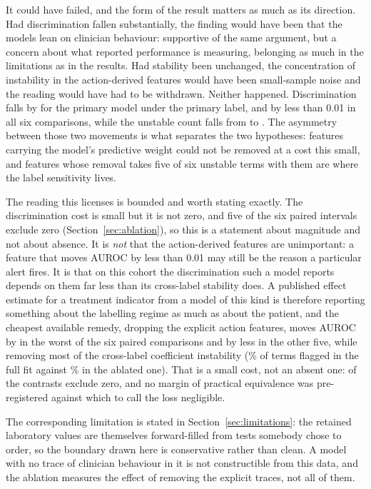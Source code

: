 It could have failed, and the form of the result matters as much as its
direction. Had discrimination fallen substantially, the finding would have been
that the models lean on clinician behaviour: supportive of the same argument,
but a concern about what reported performance is measuring, belonging as much in
the limitations as in the results. Had stability been unchanged, the
concentration of instability in the action-derived features would have been
small-sample noise and the reading would have had to be withdrawn. Neither
happened. Discrimination falls by \pcAblDeltaAurocPrimaryB{} for the primary
model under the primary label, and by less than 0.01 in all six comparisons,
while the unstable count falls from \pcHTwoEst{} to \pcAblHTwoNUnstable. The
asymmetry between those two movements is what separates the two hypotheses:
features carrying the model's predictive weight could not be removed at a cost
this small, and features whose removal takes five of six unstable terms with
them are where the label sensitivity lives.

The reading this licenses is bounded and worth stating exactly. The
discrimination cost is small but it is not zero, and five of the six paired
intervals exclude zero
(Section~\ref{sec:ablation}), so this is a statement about magnitude and not
about absence. It is \emph{not}
that the action-derived features are unimportant: a feature that
moves AUROC by less than 0.01 may still be the reason a particular alert fires.
It is that on this cohort the discrimination such a model reports depends on
them far less than its cross-label stability does. A published effect
estimate for a treatment indicator from a model of this kind is therefore
reporting something about the labelling regime as much as about the patient, and
the cheapest available remedy, dropping the explicit action features, moves
AUROC by \pcAblDeltaAurocPrimaryC{} in the worst of the six paired comparisons
and by less in the other five, while removing most of the cross-label
coefficient instability
(\pcHTwoPctUnstable\% of terms flagged in the full fit against
\pcAblHTwoPctUnstable\% in the ablated one). That is a small cost, not an
absent one: \pcAblNExcludeZero{} of the \pcAblNContrasts{} contrasts exclude
zero, and no margin of practical equivalence was pre-registered against which
to call the loss negligible.

The corresponding limitation is stated in Section~\ref{sec:limitations}: the
retained laboratory values are themselves forward-filled from tests somebody
chose to order, so the boundary drawn here is conservative rather than clean. A
model with no trace of clinician behaviour in it is not constructible from this
data, and the ablation measures the effect of removing the explicit traces, not
all of them.


